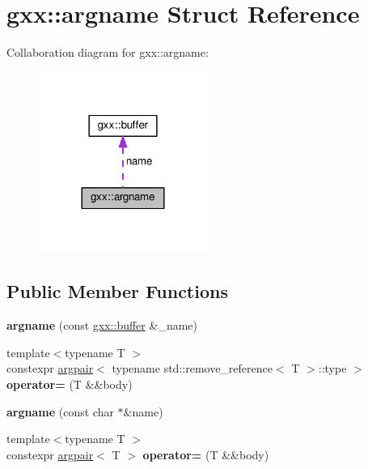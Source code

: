 \hypertarget{structgxx_1_1argname}{}\section{gxx\+:\+:argname Struct Reference}
\label{structgxx_1_1argname}


Collaboration diagram for gxx\+:\+:argname\+:\nopagebreak
\begin{figure}[H]
\begin{center}
\leavevmode
\includegraphics[width=156pt]{structgxx_1_1argname__coll__graph}
\end{center}
\end{figure}
\subsection*{Public Member Functions}
\begin{DoxyCompactItemize}
\item 
{\bfseries argname} (const \hyperlink{classgxx_1_1buffer}{gxx\+::buffer} \&\+\_\+name)\hypertarget{structgxx_1_1argname_af3d5cbd9a651c6c52d3020dc38359841}{}\label{structgxx_1_1argname_af3d5cbd9a651c6c52d3020dc38359841}

\item 
{\footnotesize template$<$typename T $>$ }\\constexpr \hyperlink{classgxx_1_1argpair}{argpair}$<$ typename std\+::remove\+\_\+reference$<$ T $>$\+::type $>$ {\bfseries operator=} (T \&\&body)\hypertarget{structgxx_1_1argname_a855215d4a37fc4aeb93f8870323f4269}{}\label{structgxx_1_1argname_a855215d4a37fc4aeb93f8870323f4269}

\item 
{\bfseries argname} (const char $\ast$\&name)\hypertarget{structgxx_1_1argname_a86bfc87d6776c03c70e63c5ffe9b927e}{}\label{structgxx_1_1argname_a86bfc87d6776c03c70e63c5ffe9b927e}

\item 
{\footnotesize template$<$typename T $>$ }\\constexpr \hyperlink{classgxx_1_1argpair}{argpair}$<$ T $>$ {\bfseries operator=} (T \&\&body)\hypertarget{structgxx_1_1argname_a8493b74166dcdb87fd967dc4687545e2}{}\label{structgxx_1_1argname_a8493b74166dcdb87fd967dc4687545e2}

\end{DoxyCompactItemize}

